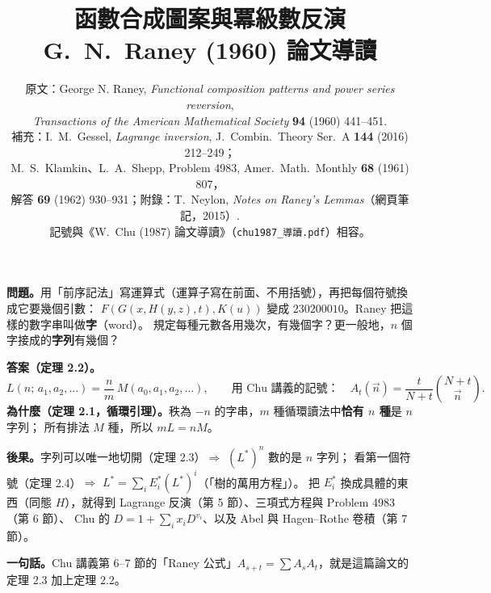 \documentclass[11pt,a4paper]{article}
\title{\textbf{函數合成圖案與冪級數反演}\\[0.3em]\large G.~N.~Raney (1960) 論文導讀}
\author{\normalsize 原文：George N. Raney, \emph{Functional composition patterns and power series reversion},\\\normalsize
\emph{Transactions of the American Mathematical Society} \textbf{94} (1960) 441--451.\\[0.25em]\normalsize
補充：I.~M.~Gessel, \emph{Lagrange inversion}, J.~Combin.\ Theory Ser.~A \textbf{144} (2016) 212--249；\\\normalsize
M.~S.~Klamkin、L.~A.~Shepp, Problem 4983, Amer.\ Math.\ Monthly \textbf{68} (1961) 807，\\\normalsize
解答 \textbf{69} (1962) 930--931；附錄：T.~Neylon, \emph{Notes on Raney's Lemmas}（網頁筆記，2015）.\\[0.25em]\normalsize
記號與《W.~Chu (1987) 論文導讀》（\texttt{chu1987\_導讀.pdf}）相容。}
\date{}
\newcommand{\vn}{\vec n}
\newcommand{\Lst}{L^{*}}                         %
\newcommand{\RL}[2]{L(#1;\,#2)}                  %
\begin{document}
\maketitle
\vspace{-2.5em}

\begin{keybox}[一頁看懂]
\textbf{問題。}用「前序記法」寫運算式（運算子寫在前面、不用括號），再把每個符號換成它要幾個引數：
$F(G(x,H(y,z),t),K(u))$ 變成 $230200010$。Raney 把這樣的數字串叫做\textbf{字}（word）。
規定每種元數各用幾次，有幾個字？更一般地，$n$ 個字接成的\textbf{字列}有幾個？

\textbf{答案（定理 2.2）。}
\[
\RL{n}{a_1,a_2,\ldots}=\frac{n}{m}\,M(a_0,a_1,a_2,\ldots),\qquad
\text{用 Chu 講義的記號：}\quad A_t(\vn)=\frac{t}{N+t}\binom{N+t}{\vn}.
\]
\textbf{為什麼（定理 2.1，循環引理）。}秩為 $-n$ 的字串，$m$ 種循環讀法中\textbf{恰有 $n$ 種}是 $n$ 字列；
所有排法 $M$ 種，所以 $mL=nM$。

\textbf{後果。}字列可以唯一地切開（定理 2.3）$\Rightarrow$ $(\Lst)^n$ 數的是 $n$ 字列；
看第一個符號（定理 2.4）$\Rightarrow$ $\Lst=\sum_i E_i^*(\Lst)^i$（「樹的萬用方程」）。
把 $E_i^*$ 換成具體的東西（同態 $H$），就得到 Lagrange 反演（第 5 節）、三項式方程與 Problem 4983（第 6 節）、
Chu 的 $D=1+\sum_ix_iD^{v_i}$、以及 Abel 與 Hagen--Rothe 卷積（第 7 節）。

\textbf{一句話。}Chu 講義第 6--7 節的「Raney 公式」$A_{s+t}=\sum A_sA_t$，就是這篇論文的定理 2.3 加上定理 2.2。
\end{keybox}

\setcounter{tocdepth}{1}
\begingroup
\setlength{\parskip}{0pt}
\tableofcontents
\endgroup
\newpage








\appendix

\end{document}
